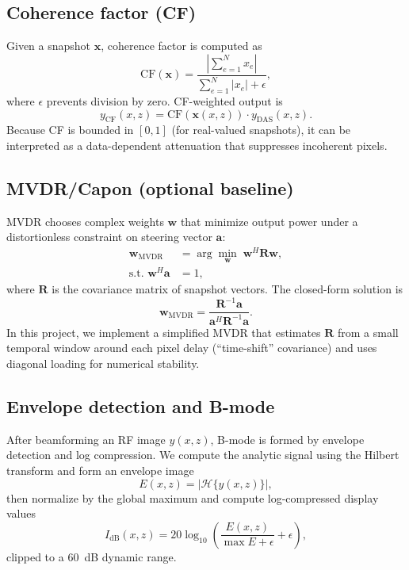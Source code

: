 \documentclass[conference]{IEEEtran}
\begin{document}
\subsection{Coherence factor (CF)}
Given a snapshot $\mathbf{x}$, coherence factor is computed as
\begin{equation}
\mathrm{CF}(\mathbf{x}) = \frac{\left|\sum_{e=1}^N x_e\right|}{\sum_{e=1}^N |x_e| + \epsilon},
\end{equation}
where $\epsilon$ prevents division by zero. CF-weighted output is
\begin{equation}
y_{\mathrm{CF}}(x,z) = \mathrm{CF}(\mathbf{x}(x,z))\cdot y_{\mathrm{DAS}}(x,z).
\end{equation}
Because CF is bounded in $[0,1]$ (for real-valued snapshots), it can be interpreted as a data-dependent attenuation that suppresses incoherent pixels.

\subsection{MVDR/Capon (optional baseline)}
MVDR chooses complex weights $\mathbf{w}$ that minimize output power under a distortionless constraint on steering vector $\mathbf{a}$:
\begin{align}
\mathbf{w}_{\mathrm{MVDR}} &= \arg\min_{\mathbf{w}}\; \mathbf{w}^H\mathbf{R}\mathbf{w},\\
\text{s.t. } \mathbf{w}^H\mathbf{a} &= 1,
\end{align}
where $\mathbf{R}$ is the covariance matrix of snapshot vectors. The closed-form solution is
\begin{equation}
\mathbf{w}_{\mathrm{MVDR}} = \frac{\mathbf{R}^{-1}\mathbf{a}}{\mathbf{a}^H\mathbf{R}^{-1}\mathbf{a}}.
\end{equation}
In this project, we implement a simplified MVDR that estimates $\mathbf{R}$ from a small temporal window around each pixel delay (``time-shift'' covariance) and uses diagonal loading for numerical stability.

\subsection{Envelope detection and B-mode}
After beamforming an RF image $y(x,z)$, B-mode is formed by envelope detection and log compression. We compute the analytic signal using the Hilbert transform and form an envelope image
\begin{equation}
E(x,z) = \left| \mathcal{H}\{y(x,z)\} \right|,
\end{equation}
then normalize by the global maximum and compute log-compressed display values
\begin{equation}
I_{\mathrm{dB}}(x,z) = 20\log_{10}\left(\frac{E(x,z)}{\max E + \epsilon} + \epsilon\right),
\end{equation}
clipped to a \SI{60}{dB} dynamic range.
\end{document}
